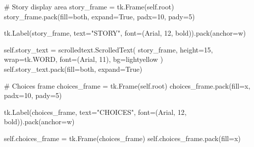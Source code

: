 \documentclass[
  letterpaper,
  DIV=11,
  numbers=noendperiod,
  oneside]{scrreprt}
\newenvironment{Shaded}{}{}
\newcommand{\CommentTok}[1]{\textcolor[rgb]{0.42,0.45,0.49}{#1}}
\newcommand{\DecValTok}[1]{\textcolor[rgb]{0.00,0.36,0.77}{#1}}
\newcommand{\NormalTok}[1]{\textcolor[rgb]{0.14,0.16,0.18}{#1}}
\newcommand{\OperatorTok}[1]{\textcolor[rgb]{0.14,0.16,0.18}{#1}}
\newcommand{\StringTok}[1]{\textcolor[rgb]{0.01,0.18,0.38}{#1}}
\newcommand{\VariableTok}[1]{\textcolor[rgb]{0.89,0.38,0.04}{#1}}
\begin{document}
\begin{Shaded}
\begin{Highlighting}[]
        \CommentTok{\# Story display area}
\NormalTok{        story\_frame }\OperatorTok{=}\NormalTok{ tk.Frame(}\VariableTok{self}\NormalTok{.root)}
\NormalTok{        story\_frame.pack(fill}\OperatorTok{=}\StringTok{\textquotesingle{}both\textquotesingle{}}\NormalTok{, expand}\OperatorTok{=}\VariableTok{True}\NormalTok{, padx}\OperatorTok{=}\DecValTok{10}\NormalTok{, pady}\OperatorTok{=}\DecValTok{5}\NormalTok{)}
        
\NormalTok{        tk.Label(story\_frame, text}\OperatorTok{=}\StringTok{"STORY"}\NormalTok{, font}\OperatorTok{=}\NormalTok{(}\StringTok{\textquotesingle{}Arial\textquotesingle{}}\NormalTok{, }\DecValTok{12}\NormalTok{, }\StringTok{\textquotesingle{}bold\textquotesingle{}}\NormalTok{)).pack(anchor}\OperatorTok{=}\StringTok{\textquotesingle{}w\textquotesingle{}}\NormalTok{)}
        
        \VariableTok{self}\NormalTok{.story\_text }\OperatorTok{=}\NormalTok{ scrolledtext.ScrolledText(}
\NormalTok{            story\_frame, height}\OperatorTok{=}\DecValTok{15}\NormalTok{, wrap}\OperatorTok{=}\NormalTok{tk.WORD, }
\NormalTok{            font}\OperatorTok{=}\NormalTok{(}\StringTok{\textquotesingle{}Arial\textquotesingle{}}\NormalTok{, }\DecValTok{11}\NormalTok{), bg}\OperatorTok{=}\StringTok{\textquotesingle{}lightyellow\textquotesingle{}}
\NormalTok{        )}
        \VariableTok{self}\NormalTok{.story\_text.pack(fill}\OperatorTok{=}\StringTok{\textquotesingle{}both\textquotesingle{}}\NormalTok{, expand}\OperatorTok{=}\VariableTok{True}\NormalTok{)}
        
        \CommentTok{\# Choices frame}
\NormalTok{        choices\_frame }\OperatorTok{=}\NormalTok{ tk.Frame(}\VariableTok{self}\NormalTok{.root)}
\NormalTok{        choices\_frame.pack(fill}\OperatorTok{=}\StringTok{\textquotesingle{}x\textquotesingle{}}\NormalTok{, padx}\OperatorTok{=}\DecValTok{10}\NormalTok{, pady}\OperatorTok{=}\DecValTok{5}\NormalTok{)}
        
\NormalTok{        tk.Label(choices\_frame, text}\OperatorTok{=}\StringTok{"CHOICES"}\NormalTok{, font}\OperatorTok{=}\NormalTok{(}\StringTok{\textquotesingle{}Arial\textquotesingle{}}\NormalTok{, }\DecValTok{12}\NormalTok{, }\StringTok{\textquotesingle{}bold\textquotesingle{}}\NormalTok{)).pack(anchor}\OperatorTok{=}\StringTok{\textquotesingle{}w\textquotesingle{}}\NormalTok{)}
        
        \VariableTok{self}\NormalTok{.choices\_frame }\OperatorTok{=}\NormalTok{ tk.Frame(choices\_frame)}
        \VariableTok{self}\NormalTok{.choices\_frame.pack(fill}\OperatorTok{=}\StringTok{\textquotesingle{}x\textquotesingle{}}\NormalTok{)}
        

\end{Highlighting}
\end{Shaded}
\end{document}
